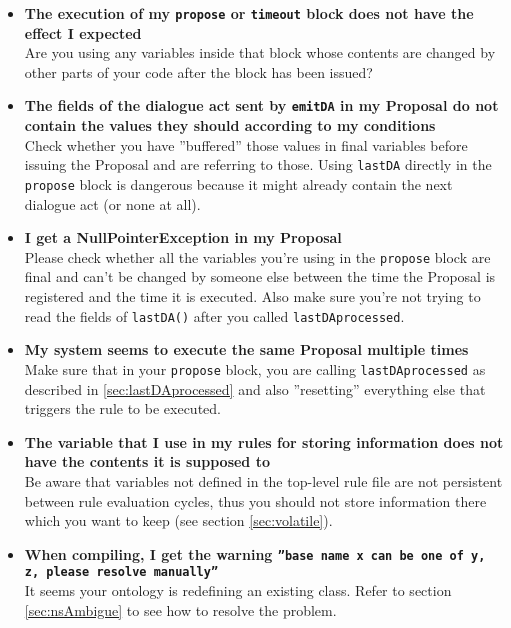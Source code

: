 \begin{itemize}

\item \textbf{The execution of my \texttt{propose} or \texttt{timeout} block does not have the effect I expected}\\
  Are you using any variables inside that block whose contents are
  changed by other parts of your code after the block has been issued?

\item \textbf{The fields of the dialogue act sent by \texttt{emitDA} in my Proposal do not contain the values they should according to my conditions}\\
  Check whether you have ''buffered'' those values in final variables
  before issuing the Proposal and are referring to those. Using
  \texttt{lastDA} directly in the \texttt{propose} block is dangerous
  because it might already contain the next dialogue act (or none at
  all).

\item \textbf{I get a NullPointerException in my Proposal}\\
  Please check whether all the variables you're using in the
  \texttt{propose} block are final and can't be changed by someone
  else between the time the Proposal is registered and the time it is
  executed. Also make sure you're not trying to read the fields of
  \texttt{lastDA()} after you called \texttt{lastDAprocessed}.

\item \textbf{My system seems to execute the same Proposal multiple times}\\
  Make sure that in your \texttt{propose} block, you are calling
  \texttt{lastDAprocessed} as described in \ref{sec:lastDAprocessed}
  and also ''resetting'' everything else that triggers the rule to be
  executed.

\item \textbf{The variable that I use in my rules for storing information does not have the contents it is supposed to}\\
  Be aware that variables not defined in the top-level rule file are
  not persistent between rule evaluation cycles, thus you should not
  store information there which you want to keep (see section
  \ref{sec:volatile}).

\item \textbf{When compiling, I get the warning \texttt{''base name x can be one of y, z, please resolve manually''}}\\
  It seems your ontology is redefining an existing class. Refer to
  section \ref{sec:nsAmbigue} to see how to resolve the problem.

\end{itemize}
